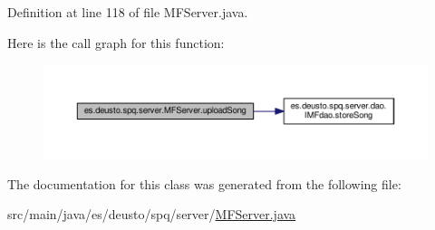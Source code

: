 Definition at line 118 of file M\+F\+Server.\+java.



Here is the call graph for this function\+:\nopagebreak
\begin{figure}[H]
\begin{center}
\leavevmode
\includegraphics[width=350pt]{classes_1_1deusto_1_1spq_1_1server_1_1_m_f_server_a6bd9178166f1294c83144ee792b15cf3_cgraph}
\end{center}
\end{figure}




The documentation for this class was generated from the following file\+:\begin{DoxyCompactItemize}
\item 
src/main/java/es/deusto/spq/server/\hyperlink{_m_f_server_8java}{M\+F\+Server.\+java}\end{DoxyCompactItemize}
